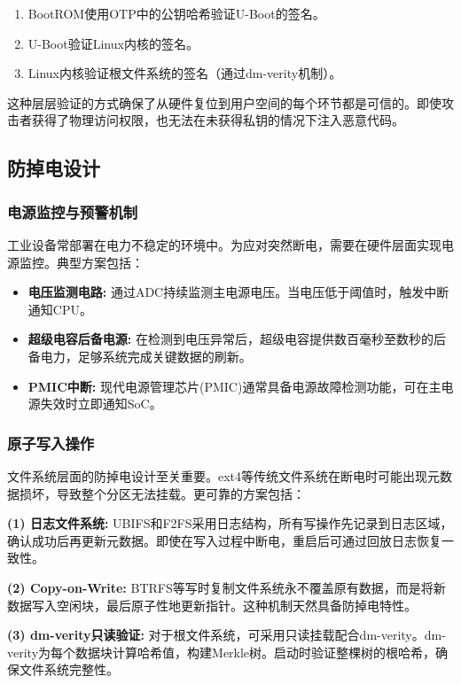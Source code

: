 \documentclass[a4paper,12pt]{article}
\begin{document}
\begin{enumerate}
    \item BootROM使用OTP中的公钥哈希验证U-Boot的签名。
    \item U-Boot验证Linux内核的签名。
    \item Linux内核验证根文件系统的签名（通过dm-verity机制）。
\end{enumerate}

这种层层验证的方式确保了从硬件复位到用户空间的每个环节都是可信的。即使攻击者获得了物理访问权限，也无法在未获得私钥的情况下注入恶意代码。

\subsection{防掉电设计}

\subsubsection{电源监控与预警机制}
工业设备常部署在电力不稳定的环境中。为应对突然断电，需要在硬件层面实现电源监控。典型方案包括：

\begin{itemize}
   \item \textbf{电压监测电路:} 通过ADC持续监测主电源电压。当电压低于阈值时，触发中断通知CPU。
   \item \textbf{超级电容后备电源:} 在检测到电压异常后，超级电容提供数百毫秒至数秒的后备电力，足够系统完成关键数据的刷新。
   \item \textbf{PMIC中断:} 现代电源管理芯片(PMIC)通常具备电源故障检测功能，可在主电源失效时立即通知SoC。
\end{itemize}

\subsubsection{原子写入操作}
文件系统层面的防掉电设计至关重要。ext4等传统文件系统在断电时可能出现元数据损坏，导致整个分区无法挂载。更可靠的方案包括：

\textbf{(1) 日志文件系统:} UBIFS和F2FS采用日志结构，所有写操作先记录到日志区域，确认成功后再更新元数据。即使在写入过程中断电，重启后可通过回放日志恢复一致性。

\textbf{(2) Copy-on-Write:} BTRFS等写时复制文件系统永不覆盖原有数据，而是将新数据写入空闲块，最后原子性地更新指针。这种机制天然具备防掉电特性。

\textbf{(3) dm-verity只读验证:} 对于根文件系统，可采用只读挂载配合dm-verity。dm-verity为每个数据块计算哈希值，构建Merkle树。启动时验证整棵树的根哈希，确保文件系统完整性。
\end{document}
